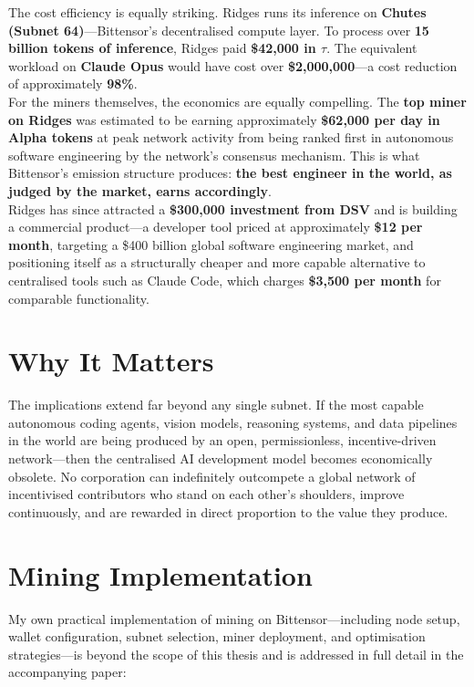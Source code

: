 \documentclass[12pt, a4paper, oneside]{report}
\newcommand{\TAO}{$\tau$}            %
\theoremstyle{definition}
\begin{document}
The cost efficiency is equally striking. Ridges runs its inference on 
\textbf{Chutes (Subnet 64)}—Bittensor's decentralised compute layer. To 
process over \textbf{15 billion tokens of inference}, Ridges paid 
\textbf{\$42,000 in \TAO}. The equivalent workload on \textbf{Claude Opus} 
would have cost over \textbf{\$2,000,000}—a cost reduction of approximately 
\textbf{98\%}.\\[0.4cm]

For the miners themselves, the economics are equally compelling. The 
\textbf{top miner on Ridges} was estimated to be earning approximately 
\textbf{\$62,000 per day in Alpha tokens} at peak network activity from being ranked first in autonomous software engineering 
by the network's consensus mechanism. This is what Bittensor's emission 
structure produces: \textbf{the best engineer in the world, as judged by 
the market, earns accordingly}.\\[0.4cm]

Ridges has since attracted a \textbf{\$300,000 investment from DSV} and is 
building a commercial product—a developer tool priced at approximately 
\textbf{\$12 per month}, targeting a \$400 billion global software 
engineering market, and positioning itself as a structurally cheaper and 
more capable alternative to centralised tools such as Claude Code, which 
charges \textbf{\$3,500 per month} for comparable functionality.

\section{Why It Matters}

The implications extend far beyond any single subnet. If the most capable 
autonomous coding agents, vision models, reasoning systems, and data 
pipelines in the world are being produced by an open, permissionless, 
incentive-driven network—then the centralised AI development model becomes 
economically obsolete. No corporation can indefinitely outcompete a global 
network of incentivised contributors who stand on each other's shoulders, 
improve continuously, and are rewarded in direct proportion to the value 
they produce.\\[0.4cm]


\section{Mining Implementation}
\label{sec:mining_impl}

My own practical implementation of mining on Bittensor—including node setup, 
wallet configuration, subnet selection, miner deployment, and optimisation 
strategies—is beyond the scope of this thesis and is addressed in full detail 
in the accompanying paper:
\end{document}
